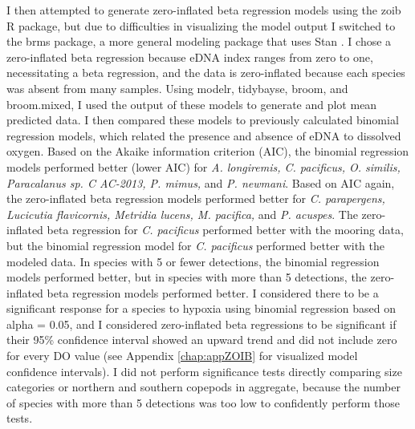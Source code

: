 \documentclass[12pt,twoside]{reedthesis}
\begin{document}
{	I then attempted to generate zero-inflated beta regression models using the zoib R package, but due to difficulties in visualizing the model output I switched to the brms package, a more general modeling package that uses Stan \autocite{Burkner2024}. I chose a zero-inflated beta regression because eDNA index ranges from zero to one, necessitating a beta regression, and the data is zero-inflated because each species was absent from many samples. Using modelr, tidybayse, broom, and broom.mixed, I used the output of these models to generate and plot mean predicted data. I then compared these models to previously calculated binomial regression models, which related the presence and absence of eDNA to dissolved oxygen. Based on the Akaike information criterion (AIC), the binomial regression models performed better (lower AIC) for \textit{A. longiremis, C. pacificus, O. similis, Paracalanus sp. C AC-2013, P. mimus,} and \textit{P. newmani}. Based on AIC again, the zero-inflated beta regression models performed better for \textit{C. parapergens, Lucicutia flavicornis, Metridia lucens, M. pacifica,} and \textit{P. acuspes}. The zero-inflated beta regression for \textit{C. pacificus} performed better with the mooring data, but the binomial regression model for \textit{C. pacificus} performed better with the modeled data. In species with 5 or fewer detections, the binomial regression models performed better, but in species with more than 5 detections, the zero-inflated beta regression models performed better. I considered there to be a significant response for a species to hypoxia using binomial regression based on alpha = 0.05, and I considered zero-inflated beta regressions to be significant if their 95\% confidence interval showed an upward trend and did not include zero for every DO value (see Appendix \ref{chap:appZOIB} for visualized model confidence intervals). I did not perform significance tests directly comparing size categories or northern and southern copepods in aggregate, because the number of species with more than 5 detections was too low to confidently perform those tests. 


}
\end{document}
